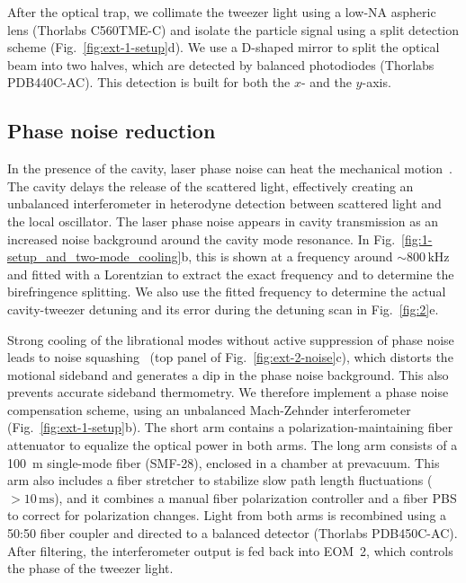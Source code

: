 \documentclass[reprint, amsmath, amssymb, superscriptaddress,showkeys,aps,pra]{revtex4-2}
\begin{document}
After the optical trap, we collimate the tweezer light using a low-NA aspheric lens (Thorlabs C560TME-C) and isolate the particle signal using a split detection scheme (Fig.~\ref{fig:ext-1-setup}d). We use a D-shaped mirror to split the optical beam into two halves, which are detected by balanced photodiodes (Thorlabs PDB440C-AC). This detection is built for both the $x$- and the $y$-axis.

\subsection{Phase noise reduction}
In the presence of the cavity, laser phase noise can heat the mechanical motion~\cite{Meyer2019}. The cavity delays the release of the scattered light, effectively creating an unbalanced interferometer in heterodyne detection between scattered light and the local oscillator. The laser phase noise appears in cavity transmission as an increased noise background around the cavity mode resonance. In Fig.~\ref{fig:1-setup_and_two-mode_cooling}b, this is shown at a frequency around $\sim800\,\text{kHz}$ and fitted with a Lorentzian to extract the exact frequency and to determine the birefringence splitting. We also use the fitted frequency to determine the actual cavity-tweezer detuning and its error during the detuning scan in Fig.~\ref{fig:2}e. 

Strong cooling of the librational modes without active suppression of phase noise leads to noise squashing~\cite{safavi-naeini_laser_2013} (top panel of Fig.~\ref{fig:ext-2-noise}c), which distorts the motional sideband and generates a dip in the phase noise background. This also prevents accurate sideband thermometry.
We therefore implement a phase noise compensation scheme, using an unbalanced Mach-Zehnder interferometer \cite{parniak_high-frequency_2021} (Fig.~\ref{fig:ext-1-setup}b). The short arm contains a polarization-maintaining fiber attenuator to equalize the optical power in both arms. The long arm consists of a \qty{100}{m} single-mode fiber (SMF-28), enclosed in a chamber at prevacuum. This arm also includes a fiber stretcher to stabilize slow path length fluctuations ($>10\,\text{ms}$), and it combines a manual fiber polarization controller and a fiber PBS to correct for polarization changes. Light from both arms is recombined using a 50:50 fiber coupler and directed to a balanced detector (Thorlabs PDB450C-AC). After filtering, the interferometer output is fed back into EOM~2, which controls the phase of the tweezer light.
\end{document}
